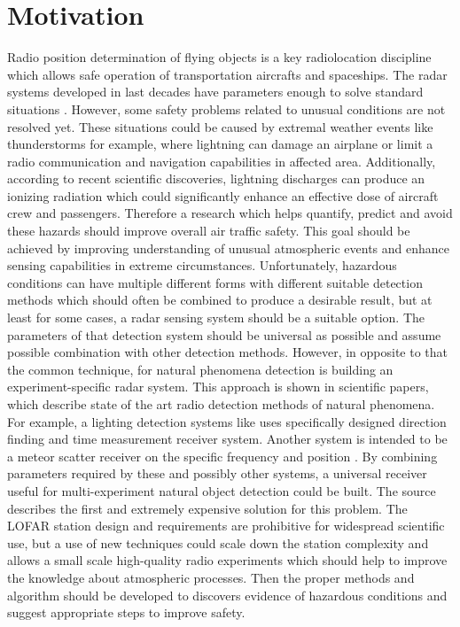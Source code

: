 \documentclass[twoside]{ctuthesis}
\theoremstyle{plain}
\theoremstyle{definition}
\theoremstyle{note}
\begin{document}
\maketitle

\chapter{Motivation}
Radio position determination of flying objects is a key radiolocation discipline which allows safe operation of transportation aircrafts and spaceships. The radar systems developed in last decades have parameters enough to solve standard situations \cite{Radar_basics}. However, some safety problems related to unusual conditions are not resolved yet. These situations could be caused by extremal weather events like thunderstorms for example, where lightning can damage an airplane or limit a radio communication and navigation capabilities in affected area. Additionally, according to recent scientific discoveries, lightning discharges can produce an ionizing radiation which could significantly enhance an effective dose of aircraft crew and passengers. 
Therefore a research which helps quantify, predict and avoid these hazards should improve overall air traffic safety. This goal should be achieved by improving understanding of unusual atmospheric events and enhance sensing capabilities in extreme circumstances. 
Unfortunately, hazardous conditions can have multiple different forms with different suitable detection methods which should often be combined to produce a desirable result, but at least for some cases, a radar sensing system should be a suitable option. 
The parameters of that detection system should be universal as possible and assume possible combination with other detection methods. 
However, in opposite to that the common technique, for natural phenomena detection is building an experiment-specific radar system. 
This approach is shown in scientific papers, which describe state of the art radio detection methods of natural phenomena. For example, a lighting detection systems like \cite{NMLMA} uses specifically designed direction finding and time measurement receiver system.  Another system is intended to be a meteor scatter receiver on the specific frequency and position \cite{BRAMS}. 
By combining parameters required by these and possibly other systems, a universal receiver useful for multi-experiment natural object detection could be built. The source \cite{LOFAR} describes the first and extremely expensive solution for this problem. The LOFAR station design and requirements are prohibitive for widespread scientific use, but a use of new techniques could scale down the station complexity and allows a small scale high-quality radio experiments which should help to improve the knowledge about atmospheric processes. Then the proper methods and algorithm should be developed to discovers evidence of hazardous conditions and suggest appropriate steps to improve safety. 
\end{document}
